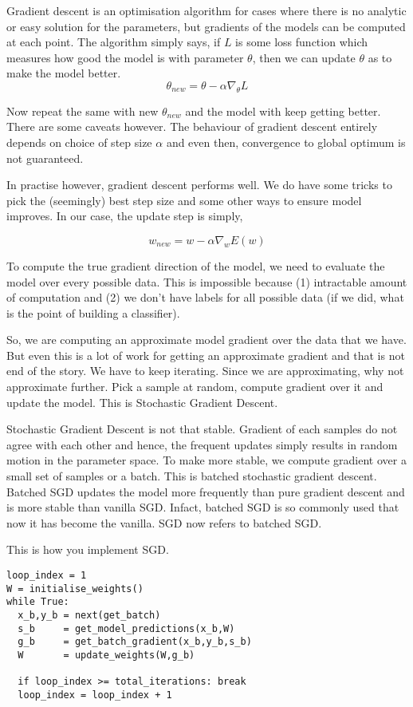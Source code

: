\documentclass[10pt]{article}
\begin{document}
Gradient descent is an optimisation algorithm for cases where there is no analytic or easy solution for the parameters, but gradients of the models can be computed at each point. The algorithm simply says, if $L$ is some loss function which measures how good the model is with parameter $\theta$, then we can update $\theta$ as to make the model better.
$$\theta_{new} = \theta - \alpha \nabla_\theta L$$

Now repeat the same with new $\theta_{new}$ and the model with keep getting better. There are some caveats however. The behaviour of gradient descent entirely depends on choice of step size $\alpha$ and even then, convergence to global optimum is not guaranteed. 

In practise however, gradient descent performs well. We do have some tricks to pick the (seemingly) best step size and some other ways to ensure model improves. In our case, the update step is simply, 

$$w_{new} = w - \alpha \nabla_{w}E(w)$$ 


To compute the true gradient direction of the model, we need to evaluate the model over every possible data. This is impossible because (1) intractable amount of computation and (2) we don't have labels for all possible data (if we did, what is the point of building a classifier). 

So, we are computing an approximate model gradient over the data that we have. But even this is a lot of work for getting an approximate gradient and that is not end of the story. We have to keep iterating. Since we are approximating, why not approximate further. Pick a sample at random, compute gradient over it and update the model. This is Stochastic Gradient Descent.

Stochastic Gradient Descent is not that stable. Gradient of each samples do not agree with each other and hence, the frequent updates simply results in random motion in the parameter space. To make more stable, we compute gradient over a small set of samples or a batch. This is batched stochastic gradient descent. Batched SGD updates the model more frequently than pure gradient descent and is more stable than vanilla SGD. Infact, batched SGD is so commonly used that now it has become the vanilla. SGD now refers to batched SGD.

This is how you implement SGD.
\begin{verbatim}
loop_index = 1
W = initialise_weights()
while True:
  x_b,y_b = next(get_batch)
  s_b     = get_model_predictions(x_b,W)
  g_b     = get_batch_gradient(x_b,y_b,s_b)
  W       = update_weights(W,g_b)

  if loop_index >= total_iterations: break
  loop_index = loop_index + 1
\end{verbatim}
\end{document}
